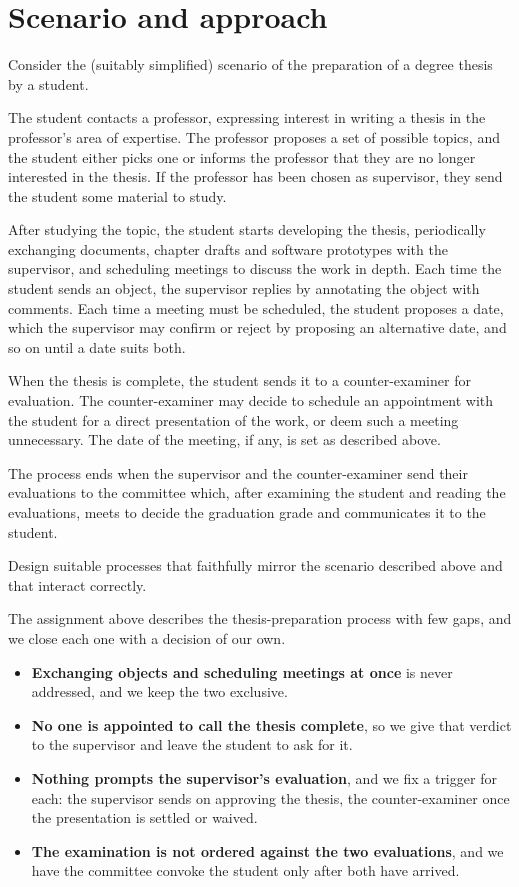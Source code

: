 \section{Scenario and approach}
\label{sec:scenario}
\begin{assignment} Consider the (suitably simplified) scenario of the preparation of a degree thesis by a student.

The student contacts a professor, expressing interest in writing a thesis in the professor's area of expertise. The professor proposes a set of possible topics, and the student either picks one or informs the professor that they are no longer interested in the thesis. If the professor has been chosen as supervisor, they send the student some material to study.

After studying the topic, the student starts developing the thesis, periodically exchanging documents, chapter drafts and software prototypes with the supervisor, and scheduling meetings to discuss the work in depth. Each time the student sends an object, the supervisor replies by annotating the object with comments. Each time a meeting must be scheduled, the student proposes a date, which the supervisor may confirm or reject by proposing an alternative date, and so on until a date suits both.

When the thesis is complete, the student sends it to a counter-examiner for evaluation. The counter-examiner may decide to schedule an appointment with the student for a direct presentation of the work, or deem such a meeting unnecessary. The date of the meeting, if any, is set as described above.

The process ends when the supervisor and the counter-examiner send their evaluations to the committee which, after examining the student and reading the evaluations, meets to decide the graduation grade and communicates it to the student.

Design suitable processes that faithfully mirror the scenario described above and that interact correctly.
\end{assignment}

The assignment above describes the thesis-preparation process with few gaps, and we close each one with a decision of our own.

\begin{itemize}
  \item \textbf{Exchanging objects and scheduling meetings at once} is never addressed, and we keep the two exclusive.
  \item \textbf{No one is appointed to call the thesis complete}, so we give that verdict to the supervisor and leave the student to ask for it.
  \item \textbf{Nothing prompts the supervisor's evaluation}, and we fix a trigger for each: the supervisor sends on approving the thesis, the counter-examiner once the presentation is settled or waived.
  \item \textbf{The examination is not ordered against the two evaluations}, and we have the committee convoke the student only after both have arrived.
\end{itemize}



